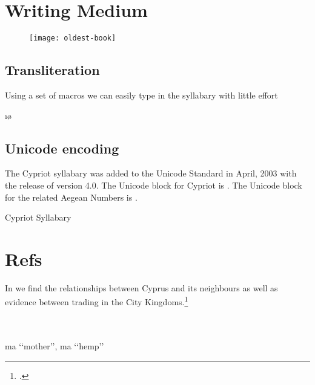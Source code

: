 \section{Writing Medium}
\lorem\lorem\lorem

\begin{figure}[htbp]
\centering

\texttt{[image: oldest-book]}

\end{figure}

\subsection{Transliteration}
Using a set of macros we can easily type in the syllabary with little effort

{\Large\startCypriote \a{\arial-}\i\o  \te\ta\po\to\to\li\ne\e\ta\li \stopCypriote}


\subsection{Unicode encoding}
The Cypriot syllabary was added to the Unicode Standard in April, 2003 with the release of version 4.0.
The Unicode block for Cypriot is . The Unicode block for the related Aegean Numbers is .



\begin{scriptexample}[]{Cypriot Syllabary}

\cypriote {}
\end{scriptexample}


\section{Refs}

In \cite{Reyes1994} we find the relationships between Cyprus and its neighbours as well as evidence between trading in the City Kingdoms.\footcite[See pages 5-34]{Reyes1994}







\bgroup
\newfontfamily{}

\ipafont


\begin{IPA}
\\
\\
ma ‘‘mother’’, ma ‘‘hemp’’


\end{IPA}

